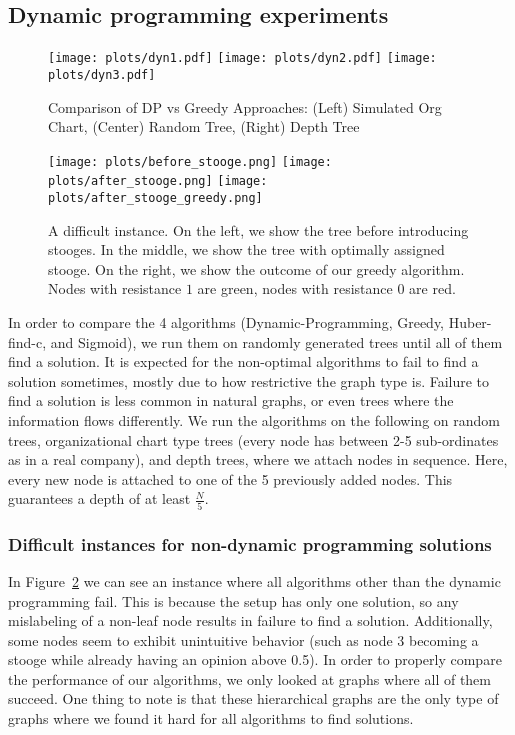 \subsection{Dynamic programming experiments}

\begin{figure}[ht]
  \centering
  \texttt{[image: plots/dyn1.pdf]}
  \texttt{[image: plots/dyn2.pdf]}
  \texttt{[image: plots/dyn3.pdf]}
  \caption{Comparison of DP vs Greedy Approaches: (Left) Simulated Org Chart, (Center) Random Tree, (Right) Depth Tree}
  \label{fig:dyn-comparison}
\end{figure}

\begin{figure}[ht]
  \centering
  \texttt{[image: plots/before\_stooge.png]}
  \texttt{[image: plots/after\_stooge.png]}  \texttt{[image: plots/after\_stooge\_greedy.png]}
  \caption{A difficult instance. On the left, we show the tree
 before introducing stooges. In the middle, we show the tree with optimally assigned stooge. On the right, we show the outcome of our greedy algorithm. Nodes with resistance $1$ are green, nodes with resistance $0$ are red.}
  \label{fig:dyn-hard}
\end{figure}

In order to compare the 4 algorithms (Dynamic-Programming, Greedy, Huber-find-c, and Sigmoid), we run them on randomly generated trees until all of them find a solution. It is expected for the non-optimal algorithms to fail to find a solution sometimes, mostly due to how restrictive the graph type is. Failure to find a solution is less common in natural graphs, or even trees where the information flows differently.
%
We run the algorithms on the following on random trees, organizational chart type trees (every node has between 2-5 sub-ordinates as in a real company), and  depth trees, where we attach nodes in sequence. Here, every new node is attached to one of the 5 previously added nodes. This guarantees a depth of at least $\frac{N}{5}$.

\subsubsection{Difficult instances for non-dynamic programming solutions}

In Figure~\ref{fig:dyn-hard} we can see an instance where all algorithms other than the dynamic programming fail. This is because the setup has only one solution, so any mislabeling of a non-leaf node results in failure to find a solution. Additionally, some nodes seem to exhibit unintuitive behavior (such as node 3 becoming a stooge while already having an opinion above 0.5). In order to properly compare the performance of our algorithms, we only looked at graphs where all of them succeed. One thing to note is that these hierarchical graphs are the only type of graphs where we found it hard for all algorithms to find solutions. 

